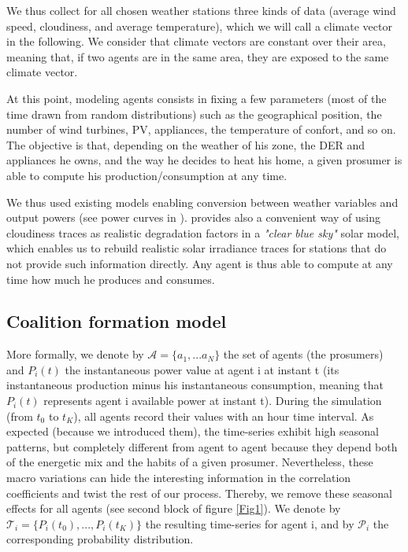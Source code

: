 \documentclass[conference]{IEEEtran}
\begin{document}
We thus collect for all chosen weather stations three kinds of data (average wind speed, cloudiness, and average temperature), which we will call a climate vector in the following. We consider that climate vectors are constant over their area, meaning that, if two agents are in the same area, they are exposed to the same climate vector.

At this point, modeling agents consists in fixing a few parameters (most of the time drawn from random distributions) such as the geographical position, the number of wind turbines, PV, appliances, the temperature of confort, and so on. The objective is that, depending on the weather of his zone, the DER and appliances he owns, and the way he decides to heat his home, a given prosumer is able to compute his production/consumption at any time. 

We thus used existing models enabling conversion between weather variables and output powers (see power curves in \cite{Kota2011} \cite{windturbinemodel}). \cite{Dans2007} provides also a convenient way of using cloudiness traces as realistic degradation factors in a \textit{"clear blue sky"} solar model, which enables us to rebuild realistic solar irradiance traces for stations that do not provide such information directly. Any agent is thus able to compute at any time how much he produces and consumes. 

\subsection{Coalition formation model}\label{subsec:Coalition}
More formally, we denote by $ \mathcal{A} = \{ a_{1},...a_{N} \} $ the set of agents (the prosumers) and $ P_{i}(t) $ the instantaneous power value at agent i at instant t (its instantaneous production minus his instantaneous consumption, meaning that $ P_{i}(t) $ represents agent i available power at instant t). During the simulation (from $t_{0} $ to $ t_{K} $), all agents record their values with an hour time interval. As expected (because we introduced them), the time-series exhibit high seasonal patterns, but completely different from agent to agent because they depend both of the energetic mix and the habits of a given prosumer. Nevertheless, these macro variations can hide the interesting information in the correlation coefficients and twist the rest of our process. Thereby, we remove these seasonal effects for all agents (see second block of figure \ref{Fig1}). We denote by $ \mathcal{T}_{i} = \{ P_{i}(t_{0}),...,P_{i}(t_{K}) \} $ the resulting time-series for  agent i, and by $ \mathcal{P}_{i} $ the corresponding probability distribution.
\end{document}
